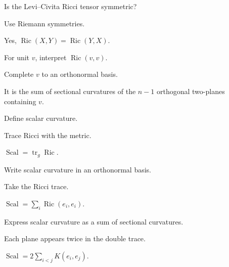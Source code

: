 \begin{exercise}\label{exr:vii27-03}
Is the Levi--Civita Ricci tensor symmetric?
\end{exercise}
\begin{hint}
Use Riemann symmetries.
\end{hint}
\begin{solution}
Yes, \(\operatorname{Ric}(X,Y)=\operatorname{Ric}(Y,X)\).
\end{solution}

\begin{exercise}\label{exr:vii27-04}
For unit \(v\), interpret \(\operatorname{Ric}(v,v)\).
\end{exercise}
\begin{hint}
Complete \(v\) to an orthonormal basis.
\end{hint}
\begin{solution}
It is the sum of sectional curvatures of the \(n-1\) orthogonal two-planes containing \(v\).
\end{solution}

\begin{exercise}\label{exr:vii27-05}
Define scalar curvature.
\end{exercise}
\begin{hint}
Trace Ricci with the metric.
\end{hint}
\begin{solution}
\(\operatorname{Scal}=\operatorname{tr}_g\operatorname{Ric}\).
\end{solution}

\begin{exercise}\label{exr:vii27-06}
Write scalar curvature in an orthonormal basis.
\end{exercise}
\begin{hint}
Take the Ricci trace.
\end{hint}
\begin{solution}
\(\operatorname{Scal}=\sum_i\operatorname{Ric}(e_i,e_i)\).
\end{solution}

\begin{exercise}\label{exr:vii27-07}
Express scalar curvature as a sum of sectional curvatures.
\end{exercise}
\begin{hint}
Each plane appears twice in the double trace.
\end{hint}
\begin{solution}
\(\operatorname{Scal}=2\sum_{i<j}K(e_i,e_j)\).
\end{solution}

